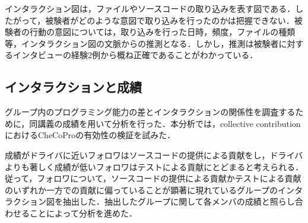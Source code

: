 インタラクション図は，ファイルやソースコードの取り込みを表す図である．したがって，被験者がどのような意図で取り込みを行ったのかは把握できない．被験者の行動の意図については，取り込みを行った日時，頻度，ファイルの種類等，インタラクション図の文脈からの推測となる．しかし，推測は被験者に対するインタビューの経験2例から概ね正確であることがわかっている\cite{加藤優哉2014}．


\subsection{インタラクションと成績}

グループ内のプログラミング能力の差とインタラクションの関係性を調査するために，同講義の成績を用いて分析を行った．本分析では，collective contributionにおけるCheCoProの有効性の検証を試みた．

成績がドライバに近いフォロワはソースコードの提供による貢献をし，ドライバよりも著しく成績が低いフォロワはテストによる貢献にとどまると考えられる．従って，フォロワについて，ソースコードの提供による貢献かテストによる貢献のいずれか一方での貢献に偏っていることが顕著に現れているグループのインタラクション図を抽出した．抽出したグループに関して各メンバの成績と照らし合わせることによって分析を進めた．